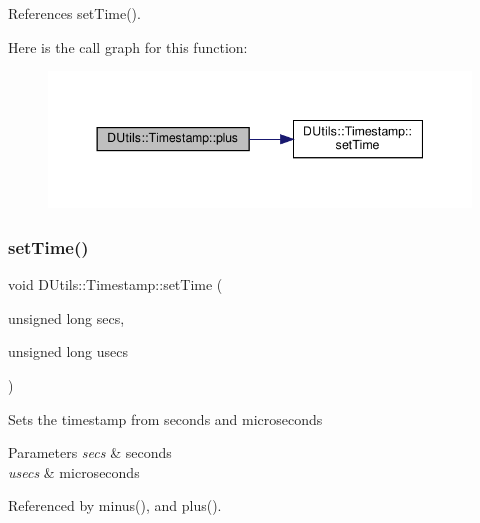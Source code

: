 References set\+Time().

Here is the call graph for this function\+:\nopagebreak
\begin{figure}[H]
\begin{center}
\leavevmode
\includegraphics[width=344pt]{classDUtils_1_1Timestamp_aaee4b5b30d2130e622636350c1332fcf_cgraph}
\end{center}
\end{figure}
\mbox{\label{classDUtils_1_1Timestamp_a439bcff577f3ae30e8918897ecb33e76}} 
\subsubsection{\texorpdfstring{set\+Time()}{setTime()}\hspace{0.1cm}{\footnotesize\ttfamily [1/3]}}
{\footnotesize\ttfamily void D\+Utils\+::\+Timestamp\+::set\+Time (\begin{DoxyParamCaption}\item[{unsigned long}]{secs,  }\item[{unsigned long}]{usecs }\end{DoxyParamCaption})\hspace{0.3cm}{\ttfamily [inline]}}

Sets the timestamp from seconds and microseconds 
\begin{DoxyParams}{Parameters}
{\em secs} & seconds \\
\hline
{\em usecs} & microseconds \\
\hline
\end{DoxyParams}


Referenced by minus(), and plus().

